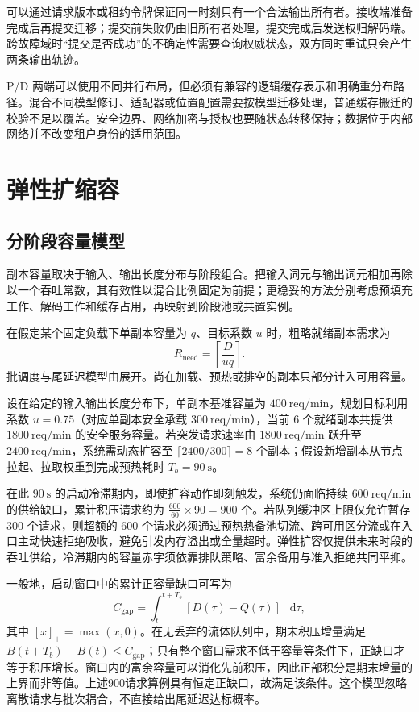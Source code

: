\documentclass[../textbook.tex]{subfiles}
\begin{document}
可以通过请求版本或租约令牌保证同一时刻只有一个合法输出所有者。接收端准备完成后再提交迁移；提交前失败仍由旧所有者处理，提交完成后发送权归解码端。跨故障域时“提交是否成功”的不确定性需要查询权威状态，双方同时重试只会产生两条输出轨迹。

P/D 两端可以使用不同并行布局，但必须有兼容的逻辑缓存表示和明确重分布路径。混合不同模型修订、适配器或位置配置需要按模型迁移处理，普通缓存搬迁的校验不足以覆盖。安全边界、网络加密与授权也要随状态转移保持；数据位于内部网络并不改变租户身份的适用范围。

\section{弹性扩缩容}

\subsection{分阶段容量模型}
副本容量取决于输入、输出长度分布与阶段组合。把输入词元与输出词元相加再除以一个吞吐常数，其有效性以混合比例固定为前提；更稳妥的方法分别考虑预填充工作、解码工作和缓存占用，再映射到阶段池或共置实例。

在假定某个固定负载下单副本容量为 $q$、目标系数 $u$ 时，粗略就绪副本需求为
\begin{equation}
 R_{\mathrm{need}}=\left\lceil\frac{D}{uq}\right\rceil.
\end{equation}
批调度与尾延迟模型由展开。尚在加载、预热或排空的副本只部分计入可用容量。

\begin{example}[服务容量测算]


设在给定的输入输出长度分布下，单副本基准容量为 $\qty{400}{\text{req}/\minute}$，规划目标利用系数 $u = 0.75$（对应单副本安全承载 $\qty{300}{\text{req}/\minute}$），当前 $6$ 个就绪副本共提供 $\qty{1800}{\text{req}/\minute}$ 的安全服务容量。若突发请求速率由 $\qty{1800}{\text{req}/\minute}$ 跃升至 $\qty{2400}{\text{req}/\minute}$，系统需动态扩容至 $\lceil 2400 / 300 \rceil = 8$ 个副本；假设新增副本从节点拉起、拉取权重到完成预热耗时 $T_b = \qty{90}{\second}$。

在此 $\qty{90}{\second}$ 的启动冷滞期内，即使扩容动作即刻触发，系统仍面临持续 $\qty{600}{\text{req}/\minute}$ 的供给缺口，累计积压请求约为 $\frac{600}{60} \times 90 = 900$ 个。若队列缓冲区上限仅允许暂存 $300$ 个请求，则超额的 $600$ 个请求必须通过预热热备池切流、跨可用区分流或在入口主动快速拒绝吸收，避免引发内存溢出或全量超时。弹性扩容仅提供未来时段的吞吐供给，冷滞期内的容量赤字须依靠排队策略、富余备用与准入拒绝共同平抑。

一般地，启动窗口中的累计正容量缺口可写为
\begin{equation*}
 C_{\mathrm{gap}}=\int_{t}^{t+T_b}[D(\tau)-Q(\tau)]_+\,\mathrm d\tau,
\end{equation*}
其中 $[x]_+=\max(x,0)$。在无丢弃的流体队列中，期末积压增量满足 $B(t+T_b)-B(t)\le C_{\mathrm{gap}}$；只有整个窗口需求不低于容量等条件下，正缺口才等于积压增长。窗口内的富余容量可以消化先前积压，因此正部积分是期末增量的上界而非等值。上述900请求算例具有恒定正缺口，故满足该条件。这个模型忽略离散请求与批次耦合，不直接给出尾延迟达标概率。
\end{example}
\end{document}
